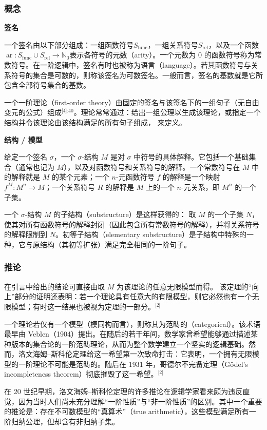 \subsubsection{概念}
\textbf{签名}

一个签名由以下部分组成：一组函数符号\(S_{\text{func}}\)，一组关系符号\(S_{\text{rel}}\)，以及一个函数\(\operatorname{ar} : S_{\text{func}} \cup S_{\text{rel}} \to \mathbb{N}_0\)表示各符号的元数（arity）。一个元数为 0 的函数符号称为常数符号。在一阶逻辑中，签名有时也被称为语言（language）。若其函数符号与关系符号的集合是可数的，则称该签名为可数签名。一般而言，签名的基数就是它所包含全部符号集合的基数。

一个一阶理论（first-order theory）由固定的签名与该签名下的一组句子（无自由变元的公式）组成\(^\text{[4]:40}\)。理论常常通过：给出一组公理以生成该理论，或指定一个结构并令该理论由该结构满足的所有句子组成，  
来定义。

\textbf{结构 / 模型}

给定一个签名 \(\sigma\)，一个 \(\sigma\)-结构 \(M\) 是对 \(\sigma\) 中符号的具体解释。它包括一个基础集合（通常也记为 \(M\)），以及对函数符号和关系符号的解释。一个常数符号在 \(M\) 中的解释就是 \(M\) 的某个元素；一个 \(n\)-元函数符号 \(f\) 的解释是一个映射 \(f^M : M^n \to M\)；一个关系符号 \(R\) 的解释是 \(M\) 上的一个 \(n\)-元关系，即 \(M^n\) 的一个子集。

一个 \(\sigma\)-结构 \(M\) 的子结构（substructure）是这样获得的：  
取 \(M\) 的一个子集 \(N\)，使其对所有函数符号的解释封闭（因此包含所有常数符号的解释），并将关系符号的解释限制到 \(N\)。初等子结构（elementary substructure）是子结构中特殊的一种，它与原结构（其初等扩张）满足完全相同的一阶句子。
\subsubsection{推论}
在引言中给出的结论可直接由取 \( M \) 为该理论的任意无限模型而得。  
该定理的“向上”部分的证明还表明：若一个理论具有任意大的有限模型，则它必然也有一个无限模型；有时这一结果也被视为定理的一部分。\(^\text{[2]}\)

一个理论若仅有一个模型（模同构而言），则称其为范畴的（categorical）。该术语最早由 Veblen（1904）提出。在随后的若干年间，数学家曾希望能够通过描述某种版本的集合论的一阶范畴理论，从而为整个数学建立一个坚实的逻辑基础。然而，洛文海姆–斯科伦定理给这一希望第一次致命打击：它表明，一个拥有无限模型的一阶理论不可能是范畴的。随后在 1931 年，哥德尔不完备定理（Gödel’s incompleteness theorem）彻底摧毁了这一希望。\(^\text{[2]}\)

在 20 世纪早期，洛文海姆–斯科伦定理的许多推论在逻辑学家看来颇为违反直觉，因为当时人们尚未充分理解“一阶性质”与“非一阶性质”的区别。其中一个重要的推论是：存在不可数模型的“真算术”（true arithmetic），这些模型满足所有一阶归纳公理，但却含有非归纳子集。

